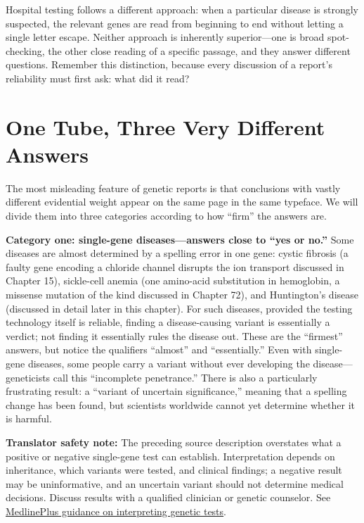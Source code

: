 Hospital testing follows a different approach: when a particular disease is strongly suspected, the relevant genes are read from beginning to end without letting a single letter escape. Neither approach is inherently superior---one is broad spot-checking, the other close reading of a specific passage, and they answer different questions. Remember this distinction, because every discussion of a report's reliability must first ask: what did it read?

\section{One Tube, Three Very Different Answers}

The most misleading feature of genetic reports is that conclusions with vastly different evidential weight appear on the same page in the same typeface. We will divide them into three categories according to how ``firm'' the answers are.

\textbf{Category one: single-gene diseases---answers close to ``yes or no.''} Some diseases are almost determined by a spelling error in one gene: cystic fibrosis (a faulty gene encoding a chloride channel disrupts the ion transport discussed in Chapter 15), sickle-cell anemia (one amino-acid substitution in hemoglobin, a missense mutation of the kind discussed in Chapter 72), and Huntington's disease (discussed in detail later in this chapter). For such diseases, provided the testing technology itself is reliable, finding a disease-causing variant is essentially a verdict; not finding it essentially rules the disease out. These are the ``firmest'' answers, but notice the qualifiers ``almost'' and ``essentially.'' Even with single-gene diseases, some people carry a variant without ever developing the disease---geneticists call this ``incomplete penetrance.'' There is also a particularly frustrating result: a ``variant of uncertain significance,'' meaning that a spelling change has been found, but scientists worldwide cannot yet determine whether it is harmful.

\textbf{Translator safety note:} The preceding source description overstates what a positive or negative single-gene test can establish. Interpretation depends on inheritance, which variants were tested, and clinical findings; a negative result may be uninformative, and an uncertain variant should not determine medical decisions. Discuss results with a qualified clinician or genetic counselor. See \href{https://medlineplus.gov/genetics/understanding/testing/interpretingresults/}{MedlinePlus guidance on interpreting genetic tests}.

